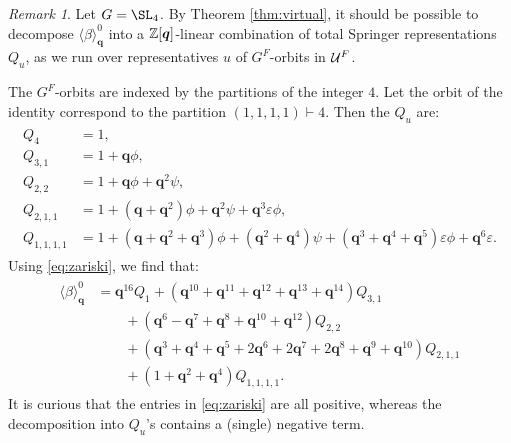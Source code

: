 \documentclass[a4paper,10pt,leqno]{amsart}
\theoremstyle{plain}
\theoremstyle{plain}
\theoremstyle{plain}
\theoremstyle{definition}
\theoremstyle{remark}
\newtheorem{rem}[thm]{Remark}
\newcommand{\Q}{\bm{q}}
\newcommand{\Tr}[1]{\langle{#1}\rangle_{\Q}}
\begin{document}
\begin{rem}
Let $G = \SL_4$.
By Theorem \ref{thm:virtual}, it should be possible to decompose $\Tr{\beta}^0$ into a $\bb{Z}[\Q]$-linear combination of total Springer representations $Q_u$, as we run over representatives $u$ of $G^F$-orbits in $\cal{U}^F$.

The $G^F$-orbits are indexed by the partitions of the integer $4$.
Let the orbit of the identity correspond to the partition $(1, 1, 1, 1) \vdash 4$.
Then the $Q_u$ are:
\begin{align}\begin{split}
Q_4
	&= 1,\\
Q_{3, 1}
	&= 1 + \Q\phi,\\
Q_{2, 2}
	&= 1 + \Q\phi + \Q^2\psi,\\
Q_{2, 1, 1}
	&= 1 + (\Q + \Q^2)\phi + \Q^2\psi + \Q^3 \varepsilon\phi,\\
Q_{1, 1, 1, 1}
	&= 1 + (\Q + \Q^2 + \Q^3)\phi + (\Q^2 + \Q^4)\psi + (\Q^3 + \Q^4 + \Q^5)\varepsilon\phi + \Q^6\varepsilon.
\end{split}\end{align}
Using \eqref{eq:zariski}, we find that:
\begin{align}\begin{split}
\Tr{\beta}^0
&= \Q^{16}Q_1 + (\Q^{10} + \Q^{11} + \Q^{12} + \Q^{13} + \Q^{14})Q_{3, 1}\\
&\qquad + (\Q^6 - \Q^7 + \Q^8 + \Q^{10} + \Q^{12})Q_{2, 2}\\
&\qquad + (\Q^3 + \Q^4 + \Q^5 + 2\Q^6 + 2\Q^7 + 2\Q^8 + \Q^9 + \Q^{10})Q_{2, 1, 1}\\
&\qquad + (1 + \Q^2 + \Q^4)Q_{1, 1, 1, 1}.
\end{split}\end{align}
It is curious that the entries in \eqref{eq:zariski} are all positive, whereas the decomposition into $Q_u$'s contains a (single) negative term.
\end{rem}

\end{document}
